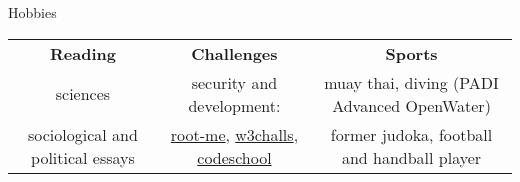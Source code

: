 \begin{rSection}{Hobbies}

  \begin{center}
      \begin{tabular}
          {c | c | c}
          \textbf{Reading} & \textbf{Challenges} & \textbf{Sports} \\
          sciences & security and development: &  muay thai, diving (PADI Advanced OpenWater) \\
          sociological and political essays  & \href{http://www.root-me.org/Pamplemouss_?inc=score&lang=en}{root-me}, \href{https://w3challs.com/profile/Pamplemouss_}{w3challs}, \href{https://www.codeschool.com/users/Pamplemouss_}{codeschool} & former judoka, football and handball player \\
      \end{tabular}
  \end{center}

\end{rSection}
